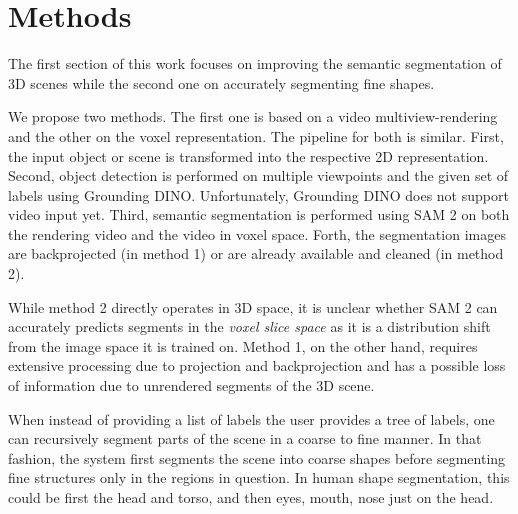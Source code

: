 \section{Methods}
\label{sec:methods}

The first section of this work focuses on improving the semantic segmentation of 3D scenes while the second one on accurately segmenting fine shapes.


We propose two methods. The first one is based on a video multiview-rendering and the other on the voxel representation. The pipeline for both is similar.
First, the input object or scene is transformed into the respective 2D representation. Second, object detection is performed on multiple viewpoints and the given set of labels using Grounding DINO. Unfortunately, Grounding DINO does not support video input yet. Third, semantic segmentation is performed using SAM 2 on both the rendering video and the video in voxel space. Forth, the segmentation images are backprojected (in method 1) or are already available and cleaned (in method 2).

While method 2 directly operates in 3D space, it is unclear whether SAM 2 can accurately predicts segments in the \textit{voxel slice space} as it is a distribution shift from the image space it is trained on. Method 1, on the other hand, requires extensive processing due to projection and backprojection and has a possible loss of information due to unrendered segments of the 3D scene. 


When instead of providing a list of labels the user provides a tree of labels, one can recursively segment parts of the scene in a coarse to fine manner. In that fashion, the system first segments the scene into coarse shapes before segmenting fine structures only in the regions in question. In human shape segmentation, this could be first the head and torso, and then eyes, mouth, nose just on the head.


